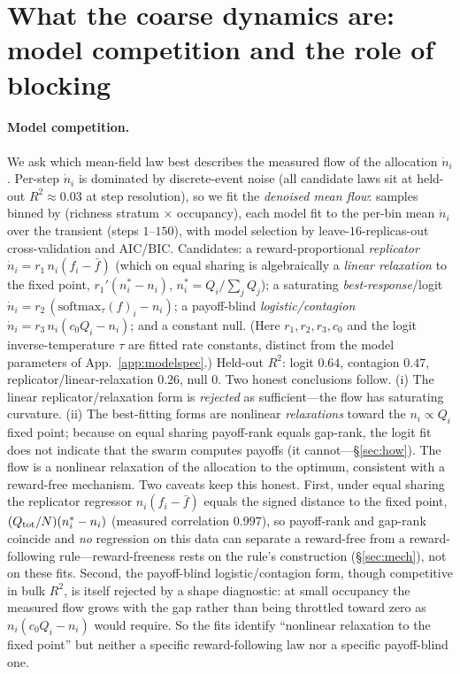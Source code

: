 \documentclass{article}
\begin{document}
\section{What the coarse dynamics are: model competition and the role of blocking}
\label{app:dynamics}
\paragraph{Model competition.} We ask which mean-field law best describes the measured flow of the allocation
$\dot n_i$. Per-step $\dot n_i$ is dominated by discrete-event noise (all candidate laws sit at held-out
$R^2\approx0.03$ at step resolution), so we fit the \emph{denoised mean flow}: samples binned by
(richness stratum $\times$ occupancy), each model fit to the per-bin mean $\dot n_i$ over the transient
(steps $1$--$150$), with model selection by leave-$16$-replicas-out cross-validation and AIC/BIC. Candidates:
a reward-proportional \emph{replicator} $\dot n_i=r_1\,n_i(f_i-\bar f)$ (which on equal sharing is
algebraically a \emph{linear relaxation} to the fixed point, $r_1'(n_i^*-n_i)$, $n_i^*=Q_i/\sum_jQ_j$);
a saturating \emph{best-response}/logit $\dot n_i=r_2\,(\mathrm{softmax}_\tau(f)_i-n_i)$; a payoff-blind
\emph{logistic/contagion} $\dot n_i=r_3\,n_i(c_0 Q_i-n_i)$; and a constant null. (Here $r_1,r_2,r_3,c_0$ and the
logit inverse-temperature $\tau$ are fitted rate constants, distinct from the model parameters of
App.~\ref{app:modelspec}.) Held-out $R^2$: logit
$0.64$, contagion $0.47$, replicator/linear-relaxation $0.26$, null $0$. Two honest conclusions follow. (i) The
linear replicator/relaxation form is \emph{rejected} as sufficient---the flow has saturating curvature. (ii)
The best-fitting forms are nonlinear \emph{relaxations} toward the $n_i\propto Q_i$ fixed point; because on
equal sharing payoff-rank equals gap-rank, the logit fit does not indicate that the swarm computes payoffs (it
cannot---\S\ref{sec:how}). The flow is a nonlinear relaxation of the allocation to the optimum, consistent with
a reward-free mechanism. Two caveats keep this honest. First, under equal sharing the replicator regressor
$n_i(f_i-\bar f)$ equals the signed distance to the fixed point, $(Q_{\rm tot}/N)(n_i^*-n_i)$ (measured
correlation $0.997$), so payoff-rank and gap-rank coincide and \emph{no} regression on this data can separate a
reward-free from a reward-following rule---reward-freeness rests on the rule's construction (\S\ref{sec:mech}),
not on these fits. Second, the payoff-blind logistic/contagion form, though competitive in bulk $R^2$, is
itself rejected by a shape diagnostic: at small occupancy the measured flow grows with the gap rather than
being throttled toward zero as $n_i(c_0 Q_i-n_i)$ would require. So the fits identify ``nonlinear relaxation to
the fixed point'' but neither a specific reward-following law nor a specific payoff-blind one.
\end{document}
